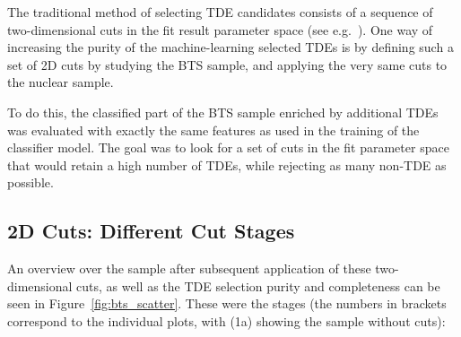 The traditional method of selecting TDE candidates consists of a sequence of two-dimensional cuts in the fit result parameter space (see e.g.~\cite{Velzen2019}). One way of increasing the purity of the machine-learning selected TDEs is by defining such a set of 2D cuts by studying the BTS sample, and applying the very same cuts to the nuclear sample.

To do this, the classified part of the BTS sample enriched by additional TDEs was evaluated with exactly the same features as used in the training of the classifier model. The goal was to look for a set of cuts in the fit parameter space that would retain a high number of TDEs, while rejecting as many non-TDE as possible.

\subsection{2D Cuts: Different Cut Stages}
An overview over the sample after subsequent application of these two-dimensional cuts, as well as the TDE selection purity and completeness can be seen in Figure~\ref{fig:bts_scatter}. These were the stages (the numbers in brackets correspond to the individual plots, with (1a) showing the sample without cuts):

